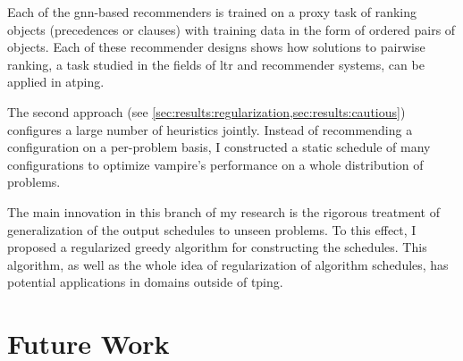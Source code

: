 Each of the \acrshort{gnn}-based recommenders is trained on a proxy task of ranking objects (precedences or clauses)
with training data in the form of ordered pairs of objects.
Each of these recommender designs shows how solutions to pairwise ranking,
a task studied in the fields of \acrlong{ltr} and recommender systems,
can be applied in \gls{atping}.

The second approach (see \cref{sec:results:regularization,sec:results:cautious}) configures a large number of heuristics jointly.
Instead of recommending a configuration on a per-problem basis,
I constructed a static schedule of many configurations to optimize \gls{vampire}'s performance on a whole distribution of problems.

The main innovation in this branch of my research is the rigorous treatment of generalization of the output schedules to unseen problems.
To this effect, I proposed a regularized greedy algorithm for constructing the schedules.
This algorithm, as well as the whole idea of regularization of algorithm schedules, has potential applications in domains outside of \gls{tping}.


\section{Future Work}

